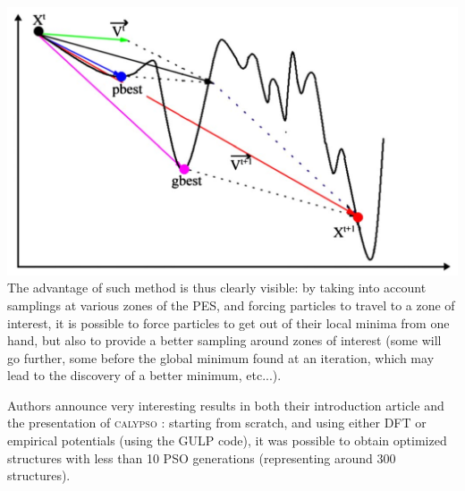 \documentclass[11pt]{article}
\begin{document}
\begin{multicols}{2}
              \noindent \includegraphics[width=\columnwidth]{figures/PSO.png}
                \medskip
The advantage of such method is thus clearly visible: by taking into account samplings at various zones of the PES, and forcing particles to travel to a zone of interest, it is possible to force particles to get out of their local minima from one hand, but also to provide a better sampling around zones of interest (some will go further, some before the global minimum found at an iteration, which may lead to the discovery of a better minimum, etc...).\vspace{1em}

Authors announce very interesting results in both their introduction article and the presentation of \textsc{calypso} \cite{PhysRevB.82.094116,WANG20122063}: starting from scratch, and using either DFT or empirical potentials (using the GULP code), it was possible to obtain optimized structures with less than 10 PSO generations (representing around 300 structures).

\end{multicols}
\end{document}
